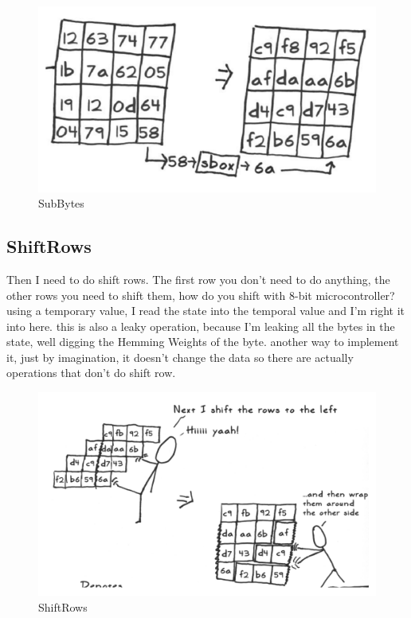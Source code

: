 \begin{figure}[htp]
\centering
\includegraphics[scale=0.2]{images/Lecture_5/Subbytes.png}
\caption{SubBytes}\label{fig:SubBytes}
\end{figure}

\subsection{ShiftRows}

Then I need to do shift rows. The first row you don't need to do anything, the
other rows you need to shift them, how do you shift with 8-bit microcontroller?
using a temporary value, I read the state into the temporal value and I'm right
it into here. this is also a leaky operation, because I'm leaking all the bytes
in the state, well digging the Hemming Weights of the byte. another way to
implement it, just by imagination, it doesn't change the data so there are
actually operations that don't do shift row.

\begin{figure}[htp]
\centering
\includegraphics[scale=0.2]{images/Lecture_5/shiftrows.png}
\caption{ShiftRows}\label{fig:ShiftRows}
\end{figure}

